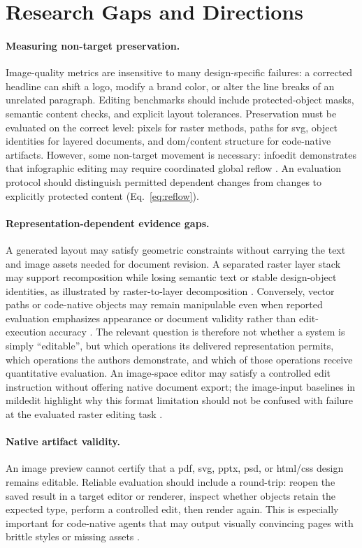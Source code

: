\section{Research Gaps and Directions}
\label{sec:discussion}
\paragraph{Measuring non-target preservation.}
Image-quality metrics are insensitive to many design-specific failures: a corrected headline can shift a logo, modify a brand color, or alter the line breaks of an unrelated paragraph.
Editing benchmarks should include protected-object masks, semantic content checks, and explicit layout tolerances.
Preservation must be evaluated on the correct level: pixels for raster methods, paths for \ac{svg}, object identities for layered documents, and \ac{dom}/content structure for code-native artifacts.
However, some non-target movement is necessary: \ac{infoedit} demonstrates that infographic editing may require coordinated global reflow \citep{yang2026infoedit}.
An evaluation protocol should distinguish permitted dependent changes from changes to explicitly protected content (Eq.~\ref{eq:reflow}).

\paragraph{Representation-dependent evidence gaps.}
A generated layout may satisfy geometric constraints without carrying the text and image assets needed for document revision.
A separated raster layer stack may support recomposition while losing semantic text or stable design-object identities, as illustrated by raster-to-layer decomposition \citep{layerd2025}.
Conversely, vector paths or code-native objects may remain manipulable even when reported evaluation emphasizes appearance or document validity rather than edit-execution accuracy \citep{vectorfusion2023,designascode2026}.
The relevant question is therefore not whether a system is simply ``editable'', but which operations its delivered representation permits, which operations the authors demonstrate, and which of those operations receive quantitative evaluation.
An image-space editor may satisfy a controlled edit instruction without offering native document export; the image-input baselines in \ac{mildedit} highlight why this format limitation should not be confused with failure at the evaluated raster editing task \citep{mildedit2026}.

\paragraph{Native artifact validity.}
An image preview cannot certify that a \ac{pdf}, \ac{svg}, \ac{pptx}, \ac{psd}, or \ac{html}/\ac{css} design remains editable.
Reliable evaluation should include a round-trip: reopen the saved result in a target editor or renderer, inspect whether objects retain the expected type, perform a controlled edit, then render again.
This is especially important for code-native agents that may output visually convincing pages with brittle styles or missing assets \citep{designascode2026,editablevisual2026}.

